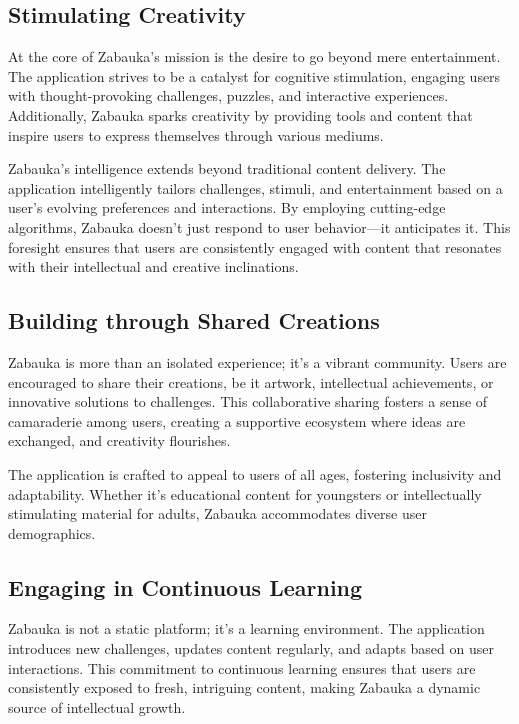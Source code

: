 \subsection{Stimulating Creativity}

At the core of Zabauka's mission is the desire to go beyond mere entertainment. The application strives to be a catalyst 
for cognitive stimulation, engaging users with thought-provoking challenges, puzzles, and interactive experiences. 
Additionally, Zabauka sparks creativity by providing tools and content that inspire users to express themselves through
various mediums.

Zabauka's intelligence extends beyond traditional content delivery. The application intelligently tailors challenges, 
stimuli, and entertainment based on a user's evolving preferences and interactions. By employing cutting-edge algorithms, 
Zabauka doesn't just respond to user behavior—it anticipates it. This foresight ensures that users are consistently 
engaged with content that resonates with their intellectual and creative inclinations.


\subsection{Building through Shared Creations}

Zabauka is more than an isolated experience; it's a vibrant community. Users are encouraged to share their creations, 
be it artwork, intellectual achievements, or innovative solutions to challenges. This collaborative sharing fosters a 
sense of camaraderie among users, creating a supportive ecosystem where ideas are exchanged, and creativity flourishes.

The application is crafted to appeal to users of all ages, fostering inclusivity and adaptability. Whether it's 
educational content for youngsters or intellectually stimulating material for adults, Zabauka accommodates diverse 
user demographics.


\subsection{Engaging in Continuous Learning}

Zabauka is not a static platform; it's a learning environment. The application introduces new challenges, updates 
content regularly, and adapts based on user interactions. This commitment to continuous learning ensures that users 
are consistently exposed to fresh, intriguing content, making Zabauka a dynamic source of intellectual growth.

